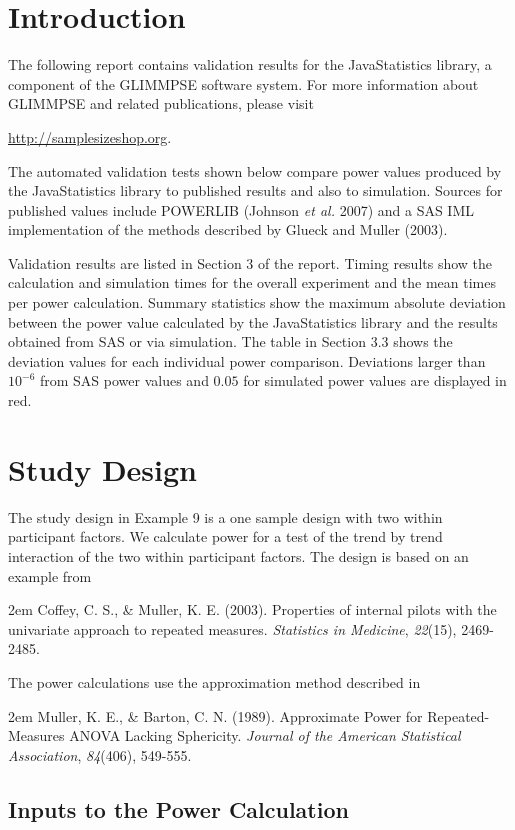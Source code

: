 \documentclass{glimmpse-report}
\begin{document}
\section{Introduction}
The following report contains validation results for the JavaStatistics library, a component of the GLIMMPSE software system.  For more information about GLIMMPSE and related publications, please visit

 

\href{http://samplesizeshop.org}{http://samplesizeshop.org}.

The automated validation tests shown below compare power values produced by the JavaStatistics library to published results and also to simulation.  Sources for published values include POWERLIB (Johnson \emph{et al.} 2007) and a SAS IML implementation of the methods described by Glueck and Muller (2003).

Validation results are listed in Section 3 of the report.  Timing results show the calculation and simulation times for the overall experiment and the mean times per power calculation.  Summary statistics show the maximum absolute deviation between the power value calculated by the JavaStatistics library and the results obtained from SAS or via simulation.  The table in Section 3.3 shows the deviation values for each individual power comparison.  Deviations larger than $10^{-6}$ from SAS power values and $0.05$ for simulated power values are displayed in red.

 \section{Study Design}
The study design in Example 9 is a one sample design with two within participant factors.  We calculate power for a test of the trend by trend interaction of the two within participant factors.  The design is based on an example from 

\hangindent2em
Coffey, C. S., \& Muller, K. E. (2003). Properties of internal pilots with the univariate approach to repeated measures. \emph{Statistics in Medicine}, \emph{22}(15), 2469-2485.

The power calculations use the approximation method described in 

\hangindent2em
Muller, K. E., \& Barton, C. N. (1989). Approximate Power for Repeated-Measures ANOVA Lacking Sphericity. \emph{Journal of the American Statistical Association}, \emph{84}(406), 549-555.
\subsection{Inputs to the Power Calculation}
\end{document}
